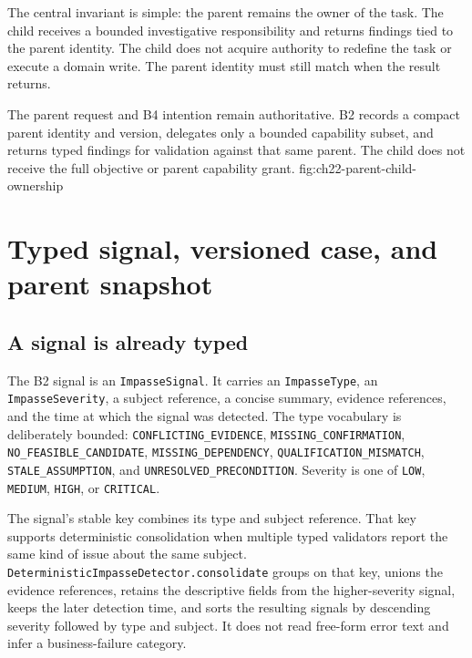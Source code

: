 The central invariant is simple: the parent remains the owner of the task. The child receives a bounded investigative responsibility and returns findings tied to the parent identity. The child does not acquire authority to redefine the task or execute a domain write. The parent identity must still match when the result returns.

  {The parent request and B4 intention remain authoritative. B2 records a compact parent identity and version, delegates only a bounded capability subset, and returns typed findings for validation against that same parent. The child does not receive the full objective or parent capability grant.}
  {fig:ch22-parent-child-ownership}

\section{Typed signal, versioned case, and parent snapshot}
\label{sec:ch22-typed-signal-case}

\subsection{A signal is already typed}
\label{subsec:ch22-signal}

The B2 signal is an \texttt{ImpasseSignal}. It carries an \texttt{ImpasseType}, an \texttt{Impasse\allowbreak Severity}, a subject reference, a concise summary, evidence references, and the time at which the signal was detected. The type vocabulary is deliberately bounded: \texttt{CONFLICTING\_\allowbreak EVIDENCE}, \texttt{MISSING\_\allowbreak CONFIRMATION}, \texttt{NO\_\allowbreak FEASIBLE\_\allowbreak CANDIDATE}, \texttt{MISSING\_\allowbreak DEPENDENCY}, \texttt{QUALIFICATION\_\allowbreak MISMATCH}, \texttt{STALE\_\allowbreak ASSUMPTION}, and \texttt{UNRESOLVED\_\allowbreak PRECONDITION}. Severity is one of \texttt{LOW}, \texttt{MEDIUM}, \texttt{HIGH}, or \texttt{CRITICAL}.

The signal's stable key combines its type and subject reference. That key supports deterministic consolidation when multiple typed validators report the same kind of issue about the same subject. \texttt{Deterministic\allowbreak Impasse\allowbreak Detector.\allowbreak consolidate} groups on that key, unions the evidence references, retains the descriptive fields from the higher-severity signal, keeps the later detection time, and sorts the resulting signals by descending severity followed by type and subject. It does not read free-form error text and infer a business-failure category.


